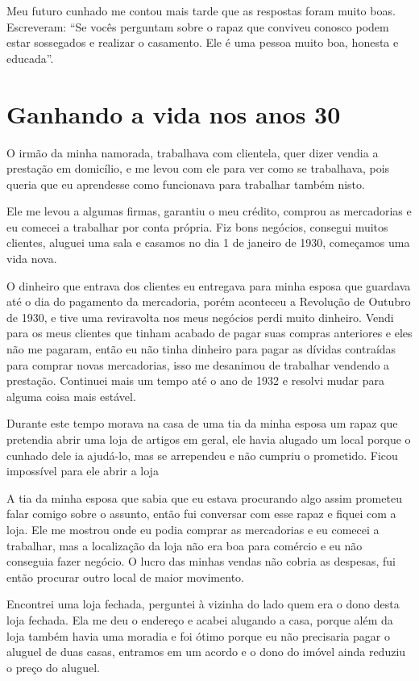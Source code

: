 Meu futuro cunhado me contou mais tarde que as respostas foram muito
boas. Escreveram: ``Se vocês perguntam sobre o rapaz que conviveu
conosco podem estar sossegados e realizar o casamento. Ele é uma pessoa
muito boa, honesta e educada''.

\chapter{Ganhando a vida nos anos 30}

O irmão da minha namorada, trabalhava com clientela, quer dizer vendia a
prestação em domicílio, e me levou com ele para ver como se trabalhava,
pois queria que eu aprendesse como funcionava para trabalhar também
nisto.

Ele me levou a algumas firmas, garantiu o meu crédito, comprou as
mercadorias e eu comecei a trabalhar por conta própria. Fiz bons
negócios, consegui muitos clientes, aluguei uma sala e casamos no dia 1
de janeiro de 1930, começamos uma vida nova.

O dinheiro que entrava dos clientes eu entregava para minha esposa que
guardava até o dia do pagamento da mercadoria, porém aconteceu a
Revolução de Outubro de 1930, e tive uma reviravolta nos meus negócios
perdi muito dinheiro. Vendi para os meus clientes que tinham acabado de
pagar suas compras anteriores e eles não me pagaram, então eu não tinha
dinheiro para pagar as dívidas contraídas para comprar novas
mercadorias, isso me desanimou de trabalhar vendendo a prestação.
Continuei mais um tempo até o ano de 1932 e resolvi mudar para alguma
coisa mais estável.

Durante este tempo morava na casa de uma tia da minha esposa um rapaz
que pretendia abrir uma loja de artigos em geral, ele havia alugado um
local porque o cunhado dele ia ajudá-lo, mas se arrependeu e não cumpriu
o prometido. Ficou impossível para ele abrir a loja

A tia da minha esposa que sabia que eu estava procurando algo assim
prometeu falar comigo sobre o assunto, então fui conversar com esse
rapaz e fiquei com a loja. Ele me mostrou onde eu podia comprar as
mercadorias e eu comecei a trabalhar, mas a localização da loja não era
boa para comércio e eu não conseguia fazer negócio. O lucro das minhas
vendas não cobria as despesas, fui então procurar outro local de maior
movimento.

Encontrei uma loja fechada, perguntei à vizinha do lado quem era o dono
desta loja fechada. Ela me deu o endereço e acabei alugando a casa,
porque além da loja também havia uma moradia e foi ótimo porque eu não
precisaria pagar o aluguel de duas casas, entramos em um acordo e o dono
do imóvel ainda reduziu o preço do aluguel.

